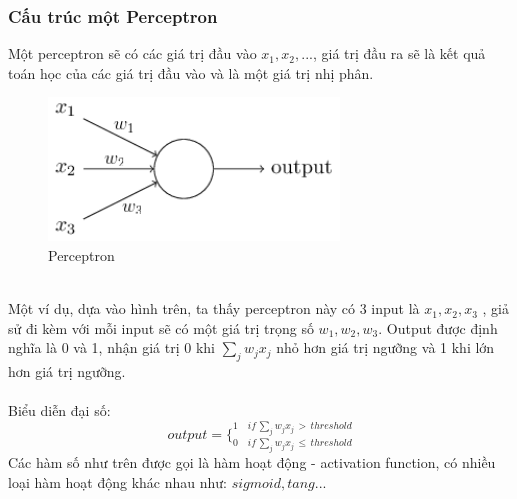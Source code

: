 \subsubsection{Cấu trúc một Perceptron}
Một perceptron sẽ có các giá trị đầu vào $x_1, x_2, ...$, giá trị đầu ra sẽ 
là kết quả toán học của các giá trị đầu vào và là một giá trị nhị phân.\\
\begin{figure}[h!]
\centering
\includegraphics[height=1.5in, keepaspectratio=true]{perceptron_n.png}
\caption{Perceptron}
\end{figure}\\
Một ví dụ, dựa vào hình trên, ta thấy perceptron này có 3 input là 
$x_1, x_2, x_3$ , giả sử đi kèm với mỗi input sẽ có một giá trị trọng 
số $w_1, w_2, w_3$. Output được định nghĩa là 0 và 1, nhận giá trị 0 
khi $\sum_j w_j x_j$ nhỏ hơn giá trị ngưỡng và 1 khi lớn hơn giá trị ngưỡng.\\\\
Biểu diễn đại số:\\
\[
  output = 
  \bigg\{
    _{0 \quad if \, \sum_j w_j x_j \, \leq \, threshold}
    ^{1 \quad if \, \sum_j w_j x_j \, > \, threshold}
\]
Các hàm số như trên được gọi là hàm hoạt động - activation function, có nhiều 
loại hàm hoạt động khác nhau như: $sigmoid , tang ...$ 

